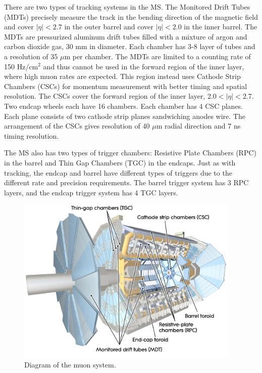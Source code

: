 There are two types of tracking systems in the MS. The Monitored Drift Tubes (MDTs) precisely measure the track in the bending direction of the magnetic field and cover $|\eta|<2.7$ in the outer barrel and cover $|\eta|<2.0$ in the inner barrel.  The MDTs are pressurized aluminum drift tubes filled with a mixture of argon and carbon dioxide gas, 30 mm in diameter. Each chamber has 3-8 layer of tubes and a resolution of 35 $\mu$m per chamber. The MDTs are limited to a counting rate of 150 Hz/cm$^2$ and thus cannot be used in the forward region of the inner layer, where high muon rates are expected. This region instead uses Cathode Strip Chambers (CSCs) for momentum measurement with better timing and spatial resolution. The CSCs cover the forward region of the inner layer, 2.0$<|\eta|<$2.7. Two endcap wheels each have 16 chambers. Each chamber has 4 CSC planes. Each plane consists of two cathode strip planes sandwiching anodes wire. The arrangement of the CSCs gives resolution of 40 $\mu$m radial direction and 7 ns timing resolution.

The MS also has two types of trigger chambers: Resistive Plate Chambers (RPC) in the barrel and Thin Gap Chambers (TGC) in the endcaps. Just as with tracking, the endcap and barrel have different types of triggers due to the different rate and precision requirements. The barrel trigger system has 3 RPC layers, and the endcap trigger system has 4 TGC layers. 

\begin{figure}[tp]
\includegraphics[width=0.95\textwidth]{fig/atlas/muonchamb.jpg}
\caption{Diagram of the muon system\cite{cern-jinst-atlas}.}
\label{fig:muonOverview}
\end{figure}


